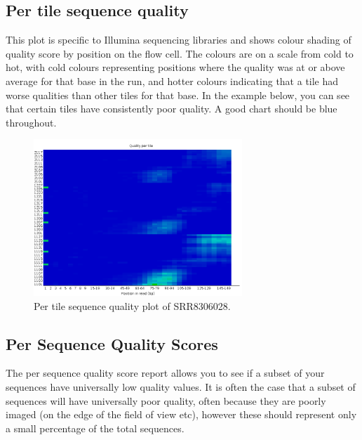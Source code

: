 \documentclass[
  letterpaper,
  DIV=11,
  numbers=noendperiod]{scrreprt}
\begin{document}
\hypertarget{per-tile-sequence-quality}{%
\subsection{Per tile sequence quality}\label{per-tile-sequence-quality}}

This plot is specific to Illumina sequencing libraries and shows colour
shading of quality score by position on the flow cell. The colours are
on a scale from cold to hot, with cold colours representing positions
where the quality was at or above average for that base in the run, and
hotter colours indicating that a tile had worse qualities than other
tiles for that base. In the example below, you can see that certain
tiles have consistently poor quality. A good chart should be blue
throughout.

\begin{figure}

{\centering \includegraphics[width=0.7\textwidth,height=\textheight]{./assets/22_fqc_per_tile_seq_qual.png}

}

\caption{Per tile sequence quality plot of SRR8306028.}

\end{figure}

\hypertarget{per-sequence-quality-scores}{%
\subsection{Per Sequence Quality
Scores}\label{per-sequence-quality-scores}}

The per sequence quality score report allows you to see if a subset of
your sequences have universally low quality values. It is often the case
that a subset of sequences will have universally poor quality, often
because they are poorly imaged (on the edge of the field of view etc),
however these should represent only a small percentage of the total
sequences.
\end{document}
